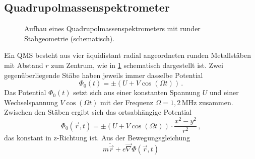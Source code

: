 \subsection{Quadrupolmassenspektrometer}\label{subsec:quadrupolmassenspektrometer}
\begin{figure}[h]
 	\centering
	\caption[Quadrupolmassenspektrometer,
	schematisch]{Aufbau eines Quadrupolmassenspektrometers mit runder
	Stabgeometrie (schematisch).}
	\label{fig:quadrupolmassenspektrometer}
\end{figure}
Ein QMS besteht aus vier äquidistant radial angeordneten runden
Metallstäben mit Abstand $r$ zum Zentrum, wie in
\ref{fig:quadrupolmassenspektrometer} schematisch dargestellt ist. Zwei
gegenüberliegende Stäbe haben jeweils immer dasselbe Potential
\begin{equation}\label{eq:qms_potential_0}
	\Phi_0(t)=\pm\left(U+V\cos{(\Omega t)}\right)\,.
\end{equation}
Das Potential $\Phi_0(t)$ setzt sich aus einer konstanten Spannung $U$
und einer Wechselspannung $V\cos{(\Omega t)}$ mit der Frequenz $\Omega=1,2\,$MHz
zusammen. Zwischen den Stäben ergibt sich das ortsabhängige Potential
\begin{equation}\label{eq:qms_potential_ort}
	\Phi_0(\vec{r},t)=\pm\left(U+V\cos{(\Omega
	t)}\right)\cdot\frac{x^2-y^2}{r^2}\,,
\end{equation}
das konstant in z-Richtung ist. Aus der Bewegungsgleichung
\begin{equation}\label{eq:qms_bewegungsgleichung}
	m\ddot{\vec{r}}+e\vec{\nabla}\Phi(\vec{r},t)
\end{equation}
